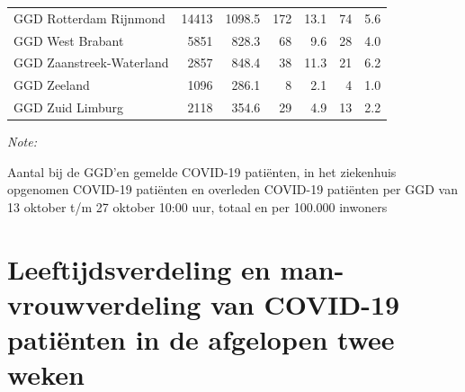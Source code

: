 \documentclass[
  english,
  man,floatsintext]{apa6}
\begin{document}
\begin{table}[H]
\begin{threeparttable}
\begin{tabular}{lrrrrrr}
GGD Rotterdam Rijnmond & 14413 & 1098.5 & 172 & 13.1 & 74 & 5.6\\
GGD West Brabant & 5851 & 828.3 & 68 & 9.6 & 28 & 4.0\\
GGD Zaanstreek-Waterland & 2857 & 848.4 & 38 & 11.3 & 21 & 6.2\\
GGD Zeeland & 1096 & 286.1 & 8 & 2.1 & 4 & 1.0\\
GGD Zuid Limburg & 2118 & 354.6 & 29 & 4.9 & 13 & 2.2\\
\bottomrule
\end{tabular}
\begin{tablenotes}
\item \textit{Note: } 
\item Aantal bij de GGD’en gemelde COVID-19 patiënten, in het ziekenhuis opgenomen COVID-19 patiënten en overleden COVID-19 patiënten per GGD van 13 oktober t/m 27 oktober 10:00 uur, totaal en per 100.000 inwoners
\end{tablenotes}
\end{threeparttable}
\endgroup{}
\end{table}

\newpage

\hypertarget{leeftijdsverdeling-en-man-vrouwverdeling-van-covid-19-patiuxebnten-in-de-afgelopen-twee-weken}{%
\section{Leeftijdsverdeling en man-vrouwverdeling van COVID-19 patiënten in de afgelopen twee weken}\label{leeftijdsverdeling-en-man-vrouwverdeling-van-covid-19-patiuxebnten-in-de-afgelopen-twee-weken}}
\end{document}

